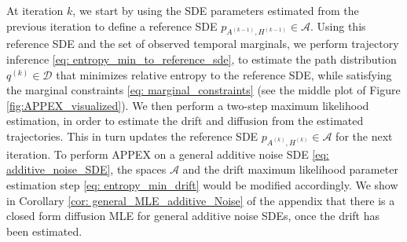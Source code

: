 \documentclass[twoside,11pt]{article}
\newcommand{\R} {\mathbb R}
\begin{document}
At iteration $k$, we start by using the SDE parameters estimated from the previous iteration to define a reference SDE $p_{A^{(k-1)}, H^{(k-1)}} \in \mathcal{A}$. Using this reference SDE and the set of observed temporal marginals, we perform trajectory inference \eqref{eq: entropy_min_to_reference_sde}, to estimate the path distribution $q^{(k)} \in \mathcal{D}$ that minimizes relative entropy to the reference SDE, while satisfying the marginal constraints \eqref{eq: marginal_constraints} (see the middle plot of Figure \ref{fig:APPEX_visualized}). We then perform a two-step maximum likelihood estimation, in order to estimate the drift and diffusion from the estimated trajectories. This in turn updates the reference SDE $p_{A^{(k)}, H^{(k)}} \in \mathcal{A}$ for the next iteration. To perform APPEX on a general additive noise SDE \eqref{eq: additive_noise_SDE}, the spaces $\mathcal{A}$ and the drift maximum likelihood parameter estimation step \eqref{eq: entropy_min_drift} would be modified accordingly. We show in Corollary \ref{cor: general_MLE_additive_Noise} of the appendix that there is a closed form diffusion MLE for general additive noise SDEs, once the drift has been estimated.

\end{document}
